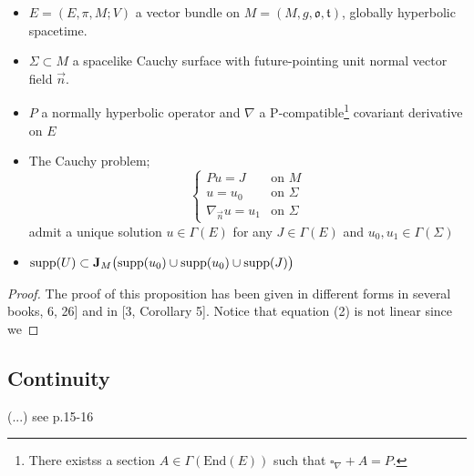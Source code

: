 \documentclass[a4paper,12pt]{scrartcl}    %
\begin{document}
	\begin{proposition}
	$ $
		\begin{hypothesis}
			\begin{itemize}
				\item $E=(E,\pi,M;V)$ a vector bundle on $M = (M,g,\mathfrak{o},\mathfrak{t}) $, globally hyperbolic spacetime.
				\item $\Sigma \subset M$ a spacelike Cauchy surface with future-pointing unit normal vector field $\vec{n}$.
				\item $P$ a normally hyperbolic operator and $\nabla$ a P-compatible\footnote{There existss a section $A \in \Gamma(\textrm{End}(E))$ such that $\square_\nabla + A = P$.} covariant derivative on $E$
			\end{itemize}
		\end{hypothesis}
	\begin{thesis}
		\begin{itemize}
			\item The Cauchy problem;
				\begin{displaymath}
					\begin{cases} 
						P u = J & \textrm{on $M$} \\ 
						u = u_0 & \textrm{on $\Sigma$}\\ 
						\nabla_{\vec{n}}u= u_1  & \textrm{on $\Sigma$}
					\end{cases}
				\end{displaymath}
				admit a unique solution $u\in \Gamma(E)$ for any $J\in \Gamma(E)$ and $ u_0,u_1 \in \Gamma(\Sigma)$
			\item $\textrm{supp}(U) \subset \mathbf{J}_M \big( \textrm{supp}(u_0) \cup \textrm{supp}(u_0) \cup \textrm{supp}(J) \big)$
		\end{itemize}
	\end{thesis}
	\end{proposition}	
	\begin{proof}
		The proof of this proposition has been given in different forms in several books, \cite{barwav}6, 26] and in [3, Corollary 5]. Notice that equation (2) is not linear since we
	\end{proof}
		
	\subsection{Continuity}
		(...) see  p.15-16 \cite{primer}


\newpage
\end{document}
